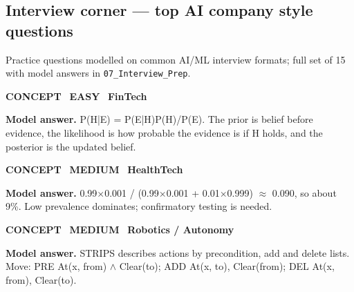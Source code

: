 \subsection*{Interview corner --- top AI company style questions}
{\small\color{slate}Practice questions modelled on common AI/ML interview formats; full set of 15 with model answers in \texttt{07\_Interview\_Prep}.}
\begin{tcolorbox}[enhanced,breakable,colback=white,colframe=teal,arc=2mm,boxrule=0.8pt,left=3mm,right=3mm,
 title={\textbf{QIV.01}\quad State Bayes' theorem and explain prior, likelihood and posterior.},fonttitle=\color{white}\small,colbacktitle=teal]
\colorbox{teal!15}{\scriptsize\bfseries\color{teal} CONCEPT}\
\colorbox{leaf!15}{\scriptsize\bfseries\color{leaf} EASY}\
\colorbox{navy!8}{\scriptsize\bfseries\color{navy} FinTech}\par\smallskip
\textbf{\color{navy}Model answer.} P(H|E) = P(E|H)P(H)/P(E). The prior is belief before evidence, the likelihood is how probable the evidence is if H holds, and the posterior is the updated belief.
\end{tcolorbox}
\begin{tcolorbox}[enhanced,breakable,colback=white,colframe=teal,arc=2mm,boxrule=0.8pt,left=3mm,right=3mm,
 title={\textbf{QIV.02}\quad A test is 99\% sensitive with a 1\% false-positive rate; prevalence is 0.1\%. What is P(disease | +)?},fonttitle=\color{white}\small,colbacktitle=teal]
\colorbox{teal!15}{\scriptsize\bfseries\color{teal} CONCEPT}\
\colorbox{gold!85!black!15}{\scriptsize\bfseries\color{gold!85!black} MEDIUM}\
\colorbox{navy!8}{\scriptsize\bfseries\color{navy} HealthTech}\par\smallskip
\textbf{\color{navy}Model answer.} 0.99$\times$0.001 / (0.99$\times$0.001 + 0.01$\times$0.999) $\approx$ 0.090, so about 9\%. Low prevalence dominates; confirmatory testing is needed.
\end{tcolorbox}
\begin{tcolorbox}[enhanced,breakable,colback=white,colframe=teal,arc=2mm,boxrule=0.8pt,left=3mm,right=3mm,
 title={\textbf{QIV.03}\quad What is STRIPS? Write the Move(x, from, to) action for a robot.},fonttitle=\color{white}\small,colbacktitle=teal]
\colorbox{teal!15}{\scriptsize\bfseries\color{teal} CONCEPT}\
\colorbox{gold!85!black!15}{\scriptsize\bfseries\color{gold!85!black} MEDIUM}\
\colorbox{navy!8}{\scriptsize\bfseries\color{navy} Robotics / Autonomy}\par\smallskip
\textbf{\color{navy}Model answer.} STRIPS describes actions by precondition, add and delete lists. Move: PRE At(x, from) $\wedge$ Clear(to); ADD At(x, to), Clear(from); DEL At(x, from), Clear(to).
\end{tcolorbox}
